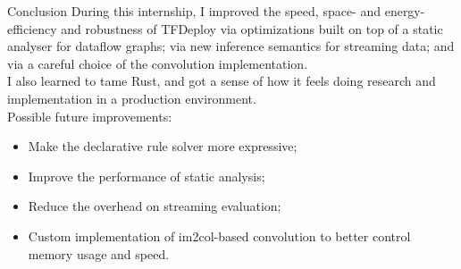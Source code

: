\documentclass{beamer}
\begin{document}
\begin{frame}{Conclusion}
\small
During this internship, I improved the speed, space- and energy-efficiency and robustness of TFDeploy via optimizations built on top of a static analyser for dataflow graphs; via new inference semantics for streaming data; and via a careful choice of the convolution implementation.\\

I also learned to tame Rust, and got a sense of how it feels doing research and implementation in a production environment.\\

Possible future improvements:
\begin{itemize}
    \item Make the declarative rule solver more expressive;
    \item Improve the performance of static analysis;
    \item Reduce the overhead on streaming evaluation;
    \item Custom implementation of im2col-based convolution to better control memory usage and speed.
\end{itemize}
\end{frame}
\end{document}
